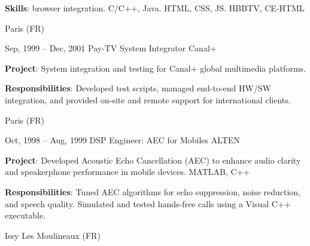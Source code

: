 \documentclass[
  a4paper,
   maincolor=cvblue,
   sectioncolor=cvblue,
   sidebarwidth=0.323\paperwidth,
]{fortysecondscv}
\begin{document}
\begin{cvtableNew}
{    \par
    \vspace{4pt}
    \textbf{Skills}: browser integration. C/C++, Java. HTML, CSS, JS. HBBTV, CE-HTML\par
  }
    {Paris (FR)} %

    \vspace{1.48mm} %

  \cvitemRightNew
    {Sep, 1999 – Dec, 2001} %
    {Pay-TV System Integrator} %
    {Canal+} %
    {
      \vspace{1pt}
      \fontsize{10.8pt}{12pt}\selectfont %
      \textbf{Project}: System integration and testing for Canal+ global multimedia platforms.\par
      \vspace{4pt}
      \textbf{Responsibilities}: Developed test scripts, managed end-to-end HW/SW integration, and provided on-site and remote support for international clients.\par
    }
    {Paris (FR)} %

    \vspace{1.48mm} %

    \cvitemRightNew
    {Oct, 1998 – Aug, 1999} %
    {DSP Engineer: AEC for Mobiles} %
    {ALTEN} %
    {
      \vspace{1pt}
      \fontsize{10.8pt}{12pt}\selectfont %
      \textbf{Project}: Developed Acoustic Echo Cancellation (AEC) to enhance audio clarity and speakerphone performance in mobile devices. MATLAB, C++\par
      \vspace{4pt}
      \textbf{Responsibilities}: Tuned AEC algorithms for echo suppression, noise reduction, and speech quality. Simulated and tested hands-free calls using a Visual C++ executable.\par
    }
    {Issy Les Moulineaux (FR)} %
\end{cvtableNew}
\end{document}
